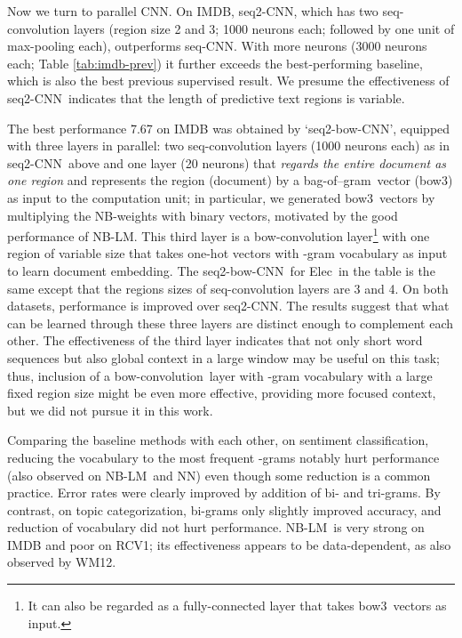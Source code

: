 \documentclass[11pt,letterpaper]{article}
\makeatletter
\newcommand{\cnn}{CNN}
\newcommand{\scnn}{seq-CNN}
\newcommand{\sscnn}{seq2-CNN}
\newcommand{\ssbcnn}{seq2-bow-CNN}
\newcommand{\bconv}{bow-convolution}
\newcommand{\bow}{{bow}}
\newcommand{\bowthree}{{bow3}}
\newcommand{\bongram}{bag-of--gram}
\newcommand{\Elec}{Elec}
\newcommand{\nbw}{NB-LM}
\newcommand\tightpara{\@startsection{paragraph}{4}{\z@}{1ex plus
   0ex minus 0.2ex}{-1em}{\normalsize\bf}}
\makeatother
\begin{document}
Now we turn to parallel \cnn. On IMDB, \sscnn, which has two seq-convolution layers 
(region size 2 and 3; 1000 neurons each; followed by one unit of max-pooling each), 
outperforms \scnn.  With more neurons (3000 neurons each; Table \ref{tab:imdb-prev}) it 
further exceeds 
the best-performing baseline, which is also the best previous supervised result.    
We presume the effectiveness of \sscnn\ indicates that the length of predictive text regions 
is variable.  

The best performance 7.67 on IMDB was obtained by `\ssbcnn', 
equipped with three layers in parallel: 
two seq-convolution layers (1000 neurons each) as in \sscnn\ above and  
one layer (20 neurons) that {\em regards the entire document as one region} and 
represents the region (document) by a \bongram\ vector (\bowthree)
as input to the computation unit; 
in particular, we generated \bowthree\ vectors by multiplying the NB-weights with binary vectors, 
motivated by the good performance of \nbw.  
This third layer is a \bow-convolution layer\footnote{
  It can also be regarded as a fully-connected layer that takes \bowthree\ vectors as input. 
}
with one region of variable size that takes 
one-hot vectors with -gram vocabulary as input to learn document embedding.  
The \ssbcnn\ for \Elec\ in the table is the same except that the regions sizes of seq-convolution layers are 
3 and 4.  On both datasets, performance is improved over \sscnn.
The results suggest that what can be learned through these three layers are distinct enough 
to complement each other.  
The effectiveness of the third layer indicates that not only short word sequences 
but also global context in a large window may be useful on this task; thus, inclusion of a 
\bconv\ layer with -gram vocabulary with a large fixed region size might be even more effective, 
providing more focused context, 
but we did not pursue it in this work.  



\tightpara{Baseline methods} 
Comparing the baseline methods with each other, on sentiment classification, 
reducing the vocabulary to the most frequent -grams notably hurt 
performance (also observed on \nbw\ and NN)
even though some reduction is a common practice. 
Error rates were clearly improved by addition of bi- and tri-grams. 
By contrast, on topic categorization, bi-grams only slightly improved accuracy, and reduction of vocabulary did not 
hurt performance.  
\nbw\ is very strong on IMDB and poor on RCV1; its effectiveness appears to be 
data-dependent, 
as also observed by WM12. 
\end{document}
